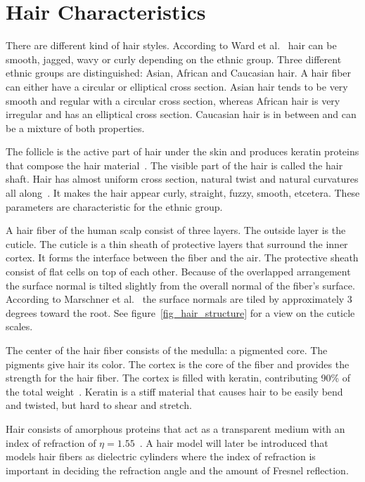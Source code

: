 \documentclass[11pt,a4paper]{report}
\begin{document}
\section{Hair Characteristics}

There are different kind of hair styles. According to Ward et al.~\cite{ward} hair can be smooth, jagged, wavy or curly depending on the ethnic group. Three different ethnic groups are distinguished: Asian, African and Caucasian hair. A hair fiber can either have a circular or elliptical cross section. Asian hair tends to be very smooth and regular with a circular cross section, whereas African hair is very irregular and has an elliptical cross section. Caucasian hair is in between and can be a mixture of both properties.

The follicle is the active part of hair under the skin and produces keratin proteins that compose the hair material~\cite{hadap}. The visible part of the hair is called the hair shaft. Hair has almost uniform cross section, natural twist and natural curvatures all along~\cite{hadap}. It makes the hair appear curly, straight, fuzzy, smooth, etcetera. These parameters are characteristic for the ethnic group.

A hair fiber of the human scalp consist of three layers. The outside layer is the cuticle. The cuticle is a thin sheath of protective layers that surround the inner cortex. It forms the interface between the fiber and the air. The protective sheath consist of flat cells on top of each other. Because of the overlapped arrangement the surface normal is tilted slightly from the overall normal of the fiber's surface. According to Marschner et al.~\cite{marschner} the surface normals are tiled by approximately 3 degrees toward the root. See figure~\ref{fig_hair_structure} for a view on the cuticle scales.

The center of the hair fiber consists of the medulla: a pigmented core. The pigments give hair its color. The cortex is the core of the fiber and provides the strength for the hair fiber. The cortex is filled with keratin, contributing 90\% of the total weight~\cite{ward}. Keratin is a stiff material that causes hair to be easily bend and twisted, but hard to shear and stretch.

Hair consists of amorphous proteins that act as a transparent medium with an index of refraction of $\eta = 1.55$~\cite{ward}. A hair model will later be introduced that models hair fibers as dielectric cylinders where the index of refraction is important in deciding the refraction angle and the amount of Fresnel reflection.
\end{document}
